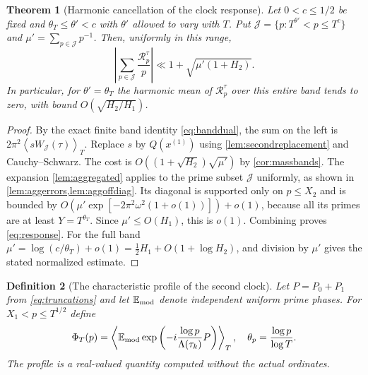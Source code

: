 \documentclass[11pt,reqno]{amsart}
\numberwithin{equation}{section}
\newtheorem{theorem}{Theorem}[section]
\newtheorem{definition}[theorem]{Definition}
\newcommand{\av}[1]{\left\langle #1\right\rangle_T}
\begin{document}
\begin{theorem}[Harmonic cancellation of the clock response]
\label{thm:response}
Let $0<c\le1/2$ be fixed and
$\theta_T\le\theta'<c$ with $\theta'$ allowed to vary with $T$.
Put
$\mathcal J=\{p:T^{\theta'}<p\le T^c\}$ and
$\mu'=\sum_{p\in\mathcal J}p^{-1}$.
Then, uniformly in this range,
\begin{equation}\label{eq:response}
\left|\sum_{p\in\mathcal J}\frac{\mathcal R_p^\tau}{p}\right|
\ll1+\sqrt{\mu'(1+H_2)}.
\end{equation}
In particular, for $\theta'=\theta_T$ the harmonic mean of
$\mathcal R_p^\tau$ over this entire band tends to zero,
with bound $O(\sqrt{H_2/H_1})$.
\end{theorem}
\begin{proof}
By the exact finite band identity \eqref{eq:banddual}, the sum
on the left is $2\pi^2\av{sW_{\mathcal J}(\tau)}$.
Replace $s$ by $Q(x^{(1)})$ using
\cref{lem:secondreplacement} and Cauchy--Schwarz.
The cost is $O((1+\sqrt{H_2})\sqrt{\mu'})$ by
\cref{cor:massbands}.  The expansion
\cref{lem:aggregated} applies to the prime subset $\mathcal J$
uniformly, as shown in \cref{lem:aggerrors,lem:aggoffdiag}.
Its diagonal is supported only on $p\le X_2$ and is bounded
by $O(\mu'\exp[-2\pi^2\omega^2(1+o(1))])+o(1)$,
because all its primes are at least $Y=T^{\theta_T}$.
Since $\mu'\le O(H_1)$, this is $o(1)$.
Combining proves \eqref{eq:response}.
For the full band $\mu'=\log(c/\theta_T)+o(1)
=\tfrac12H_1+O(1+\log H_2)$, and division by $\mu'$
gives the stated normalized estimate.
\end{proof}

\begin{definition}[The characteristic profile of the second clock]
\label{def:profile}
Let $P=P_0+P_1$ from \eqref{eq:truncations} and let
$\mathbb E_{\rm mod}$ denote independent uniform prime phases.
For $X_1<p\le T^{1/2}$ define
\begin{equation}\label{eq:profile}
\Phi_T(p)=\av{\mathbb E_{\rm mod}
\exp\left(-i\frac{\log p}{\Lambda(\tau_k)}P\right)},
\quad\theta_p=\frac{\log p}{\log T}.
\end{equation}
The profile is a real-valued quantity computed without the actual
ordinates.
\end{definition}
\end{document}
